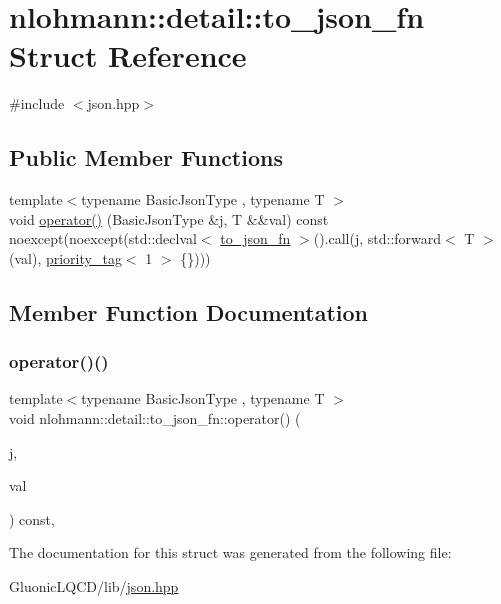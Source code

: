 \hypertarget{structnlohmann_1_1detail_1_1to__json__fn}{}\section{nlohmann\+::detail\+::to\+\_\+json\+\_\+fn Struct Reference}
\label{structnlohmann_1_1detail_1_1to__json__fn}


{\ttfamily \#include $<$json.\+hpp$>$}

\subsection*{Public Member Functions}
\begin{DoxyCompactItemize}
\item 
{\footnotesize template$<$typename Basic\+Json\+Type , typename T $>$ }\\void \mbox{\hyperlink{structnlohmann_1_1detail_1_1to__json__fn_ac63f82d3eed085522f1cbe99a521a4d4}{operator()}} (Basic\+Json\+Type \&j, T \&\&val) const noexcept(noexcept(std\+::declval$<$ \mbox{\hyperlink{structnlohmann_1_1detail_1_1to__json__fn}{to\+\_\+json\+\_\+fn}} $>$().call(j, std\+::forward$<$ T $>$(val), \mbox{\hyperlink{structnlohmann_1_1detail_1_1priority__tag}{priority\+\_\+tag}}$<$ 1 $>$ \{\})))
\end{DoxyCompactItemize}


\subsection{Member Function Documentation}
\mbox{\label{structnlohmann_1_1detail_1_1to__json__fn_ac63f82d3eed085522f1cbe99a521a4d4}} 
\subsubsection{\texorpdfstring{operator()()}{operator()()}}
{\footnotesize\ttfamily template$<$typename Basic\+Json\+Type , typename T $>$ \\
void nlohmann\+::detail\+::to\+\_\+json\+\_\+fn\+::operator() (\begin{DoxyParamCaption}\item[{Basic\+Json\+Type \&}]{j,  }\item[{T \&\&}]{val }\end{DoxyParamCaption}) const\hspace{0.3cm}{\ttfamily [inline]}, {\ttfamily [noexcept]}}



The documentation for this struct was generated from the following file\+:\begin{DoxyCompactItemize}
\item 
Gluonic\+L\+Q\+C\+D/lib/\mbox{\hyperlink{json_8hpp}{json.\+hpp}}\end{DoxyCompactItemize}
